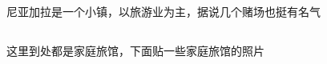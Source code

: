 ﻿\documentclass[hyperref={bookmarks=true},xcolor=pdflatex,svgnames,table,compress]{beamer}
\begin{document}
\subsection{}
\begin{frame}
\end{frame}

\subsection{}
\begin{frame}
\end{frame}

\subsection{}
\begin{frame}
\end{frame}

\subsection{}
\begin{frame}
\begin{ztebox}
尼亚加拉是一个小镇，以旅游业为主，据说几个赌场也挺有名气
\end{ztebox}
\end{frame}

\subsection{}
\begin{frame}
\begin{ztebox}
这里到处都是家庭旅馆，下面贴一些家庭旅馆的照片
\end{ztebox}
\end{frame}

\subsection{}
\begin{frame}
\end{frame}

\subsection{}
\begin{frame}
\end{frame}
\end{document}
